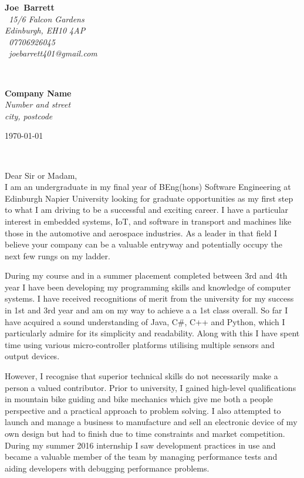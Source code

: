 \documentclass{article}
\makeatletter
\def\firstname{Joe}
\def\surname{Barrett}
\def\address{\faMapMarker~15/6 Falcon Gardens\\Edinburgh, EH10 4AP\\}
\def\phone{\faMobilePhone~07706926045}
\def\email{\faEnvelopeO~joebarrett401@gmail.com}
\def\FileAuthor{\firstname\ \surname}
\def\compName{Company Name}
\def\compAddress{Number and street\\city, postcode}
\makeatother
\begin{document}
	\hfill%
\begin{minipage}[t]{.6\textwidth}
	\raggedleft%
	{\bfseries \FileAuthor}\\[.35ex]
	\small\itshape%
	\address[.35ex]
	\phone\\
	\email

\end{minipage}\\[1em]
%
\begin{minipage}[t]{.4\textwidth}
	\raggedright%
	{\bfseries \compName}\\[.35ex]
	\small\itshape%
	\compAddress
\end{minipage}
\hfill
\begin{minipage}[t]{.4\textwidth}
	\hfill
	\raggedleft
	\today
\end{minipage}\\[2em]
\raggedright
Dear Sir or Madam,\\[1.5em]
%
I am an undergraduate in my final year of BEng(hons) Software Engineering at Edinburgh Napier University looking for graduate opportunities as my first step to what I am driving to be a successful and exciting career. I have a particular interest in embedded systems, IoT, and software in transport and machines like those in the automotive and aerospace industries. As a leader in that field I believe your company can be a valuable entryway and potentially occupy the next few rungs on my ladder.

During my course and in a summer placement completed between 3rd and 4th year I have been developing my programming skills and knowledge of computer systems. I have received recognitions of merit from the university for my success in 1st and 3rd year and am on my way to achieve a a 1st class overall. So far I have acquired a sound understanding of Java, C\#, C++ and Python, which I particularly admire for its simplicity and readability. Along with this I have spent time using various micro-controller platforms utilising multiple sensors and output devices.

However, I recognise that superior technical skills do not necessarily make a person a valued contributor. Prior to university, I gained high-level qualifications in mountain bike guiding and bike mechanics which give me both a people perspective and a practical approach to problem solving. I also attempted  to launch and manage a business to manufacture and sell an electronic device of my own design but had to finish due to time constraints and market competition. During my summer 2016 internship I saw development practices in use and became a valuable member of the team by managing performance tests and aiding developers with debugging performance problems.
\end{document}
